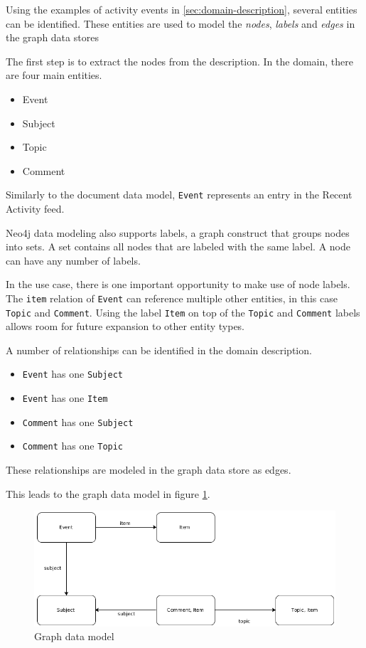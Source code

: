 Using the examples of activity events in \cref{sec:domain-description}, several entities can be identified.
These entities are used to model the \textit{nodes}, \textit{labels} and \textit{edges} in the graph data stores

The first step is to extract the nodes from the description.
In the domain, there are four main entities.

\begin{itemize}
  \item Event
  \item Subject
  \item Topic
  \item Comment
\end{itemize}

Similarly to the document data model, \texttt{Event} represents an entry in the Recent Activity feed.

Neo4j data modeling also supports labels, a graph construct that groups nodes into sets.
A set contains all nodes that are labeled with the same label.
A node can have any number of labels.

In the use case, there is one important opportunity to make use of node labels.
The \texttt{item} relation of \texttt{Event} can reference multiple other entities, in this case \texttt{Topic} and \texttt{Comment}.
Using the label \texttt{Item} on top of the \texttt{Topic} and \texttt{Comment} labels allows room for future expansion to other entity types.

A number of relationships can be identified in the domain description.

\begin{itemize}
  \item \texttt{Event} has one \texttt{Subject}
  \item \texttt{Event} has one \texttt{Item}
  \item \texttt{Comment} has one \texttt{Subject}
  \item \texttt{Comment} has one \texttt{Topic}
\end{itemize}

These relationships are modeled in the graph data store as edges.

This leads to the graph data model in figure \ref{fig:graph-model}.

\begin{figure}
  \centering
  \includegraphics[width=.8\textwidth]{img/graph-model.png}
  \caption{Graph data model}
  \label{fig:graph-model}
\end{figure}

